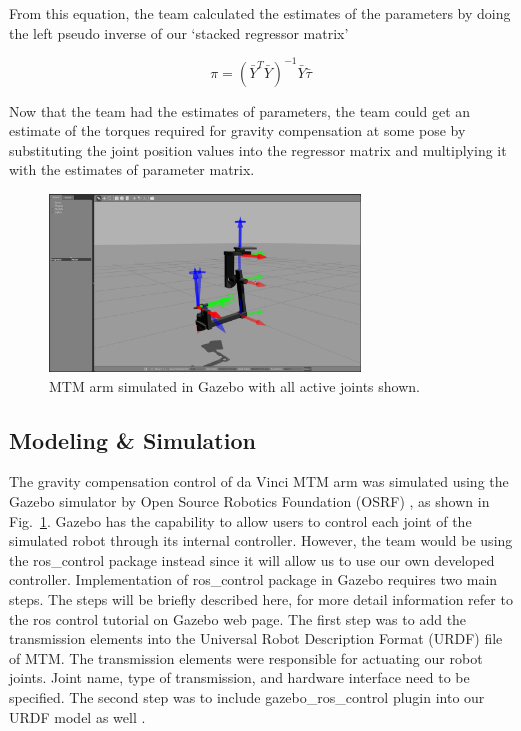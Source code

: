 \documentclass[conference]{IEEEtran}
\begin{document}
From this equation, the team calculated the estimates of the parameters by doing the left pseudo inverse of our ‘stacked regressor matrix’

\begin{equation}
\label{pseudo_inverse}
\pi = (\bar{Y}^T\bar{Y})^{-1}\bar{Y}\bar{\tau}
\end{equation}

Now that the team had the estimates of parameters, the team could get an estimate of the torques required for gravity compensation at some pose by substituting the joint position values into the regressor matrix and multiplying it with the estimates of parameter matrix.

\begin{figure}[!b]
\centering
\includegraphics[width=3.25in]{mtm_joint}
\caption{MTM arm simulated in Gazebo with all active joints shown.}
\label{mtm_joint}
\end{figure}

\subsection{Modeling \& Simulation}
The gravity compensation control of da Vinci MTM arm was simulated using the Gazebo simulator by Open Source Robotics Foundation (OSRF) \cite{5}, as shown in Fig.~\ref{mtm_joint}. Gazebo has the capability to allow users to control each joint of the simulated robot through its internal controller. However, the team would be using the ros{\_}control package instead since it will allow us to use our own developed controller. Implementation of ros{\_}control package in Gazebo requires two main steps. The steps will be briefly described here, for more detail information refer to the ros control tutorial on Gazebo web page. The first step was to add the transmission elements into the Universal Robot Description Format (URDF) file of MTM. The transmission elements were responsible for actuating our robot joints. Joint name, type of transmission, and hardware interface need to be specified.  The second step was to include gazebo{\_}ros{\_}control plugin into our URDF model as well \cite{6}.
\end{document}
